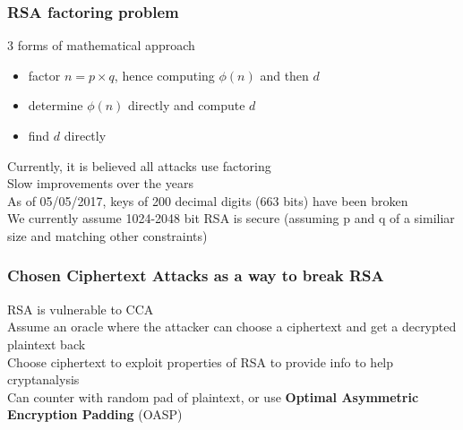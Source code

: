 \documentclass{article}
\begin{document}
\subsubsection{RSA factoring problem}
3 forms of mathematical approach
\begin{itemize}
    \item factor $n=p\times q$, hence computing $\phi(n)$ and then $d$
    \item determine $\phi(n)$ directly and compute $d$
    \item find $d$ directly
\end{itemize}
Currently, it is believed all attacks use factoring
\\Slow improvements over the years
\\As of 05/05/2017, keys of 200 decimal digits (663 bits) have been broken
\\We currently assume 1024-2048 bit RSA is secure (assuming p and q of a similiar size and matching other constraints)
\subsubsection{Chosen Ciphertext Attacks as a way to break RSA}
RSA is vulnerable to CCA
\\Assume an oracle where the attacker can choose a ciphertext and get a decrypted plaintext back
\\Choose ciphertext to exploit properties of RSA to provide info to help cryptanalysis
\\Can counter with random pad of plaintext, or use \textbf{Optimal Asymmetric Encryption Padding} (OASP)
\end{document}

